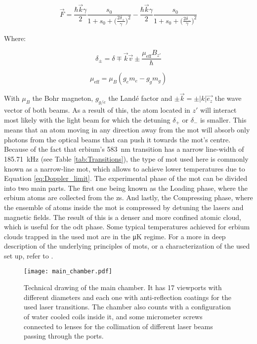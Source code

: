 \begin{equation}\label{eq:MOT_force}
	\vec{F} = \frac{\hbar \vec{k} \gamma}{2} \frac{s_0}{1 + s_0 + \Big(\frac{2\delta_+}{\gamma}\Big)^2} - \frac{\hbar \vec{k} \gamma}{2} \frac{s_0}{1 + s_0 + \Big(\frac{2\delta_-}{\gamma}\Big)^2}
\end{equation}

Where:

\begin{equation}\label{eq:delta_plus_minus}
	\delta_\pm = \delta \mp \vec{k} \vec{v} \pm \frac{ \mu_{ \text{eff} } B_{z'} }{ \hbar }
\end{equation}

\begin{equation}\label{eq:mu_eff}
	\mu_{ \text{eff} } = \mu_B (g_e m_e - g_g m_g)
\end{equation}

With $\mu_B$ the Bohr magneton, $g_{g/e}$ the Landé factor and $\pm \vec{k} = \pm |k| \vec{e_z}$ the wave vector of both beams. As a result of this, the atom located in $z'$ will interact most likely with the light beam for which the detuning $\delta_+$ or $\delta_-$ is smaller. This means that an atom moving in any direction away from the \ac{mot} will absorb only photons from the optical beams that can push it towards the \ac{mot}'s centre. Because of the fact that erbium's \SI{583}{\nano\meter} transition has a narrow line-width of \SI{185.71}{\kilo\hertz} (see Table \ref{tab:Transitions}), the type of \ac{mot} used here is commonly known as a narrow-line \ac{mot}, which allows to achieve lower temperatures due to Equation \eqref{eq:Doppler_limit}. The experimental phase of the \ac{mot} can be divided into two main parts. The first one being known as the Loading phase, where the erbium atoms are collected from the \ac{zs}. And lastly, the Compressing phase, where the ensemble of atoms inside the \ac{mot} is compressed by detuning the lasers and magnetic fields. The result of this is a denser and more confined atomic cloud, which is useful for the \ac{odt} phase. Some typical temperatures achieved for erbium clouds trapped in the used \ac{mot} are in the \si{\micro\kelvin} regime. For a more in deep description of the underlying principles of \Aclp{mot}, or a characterization of the used set up, refer to \cite{Metcalf1999, Ulitzsch2016, Roell2016}. 

\pagebreak

\begin{figure}[!htbp]\centering
	\texttt{[image: main\_chamber.pdf]}
	\caption[Technical drawing of the main chamber]{Technical drawing of the main chamber. It has 17 viewports with different diameters and each one with anti-reflection coatings for the used laser transitions. The chamber also counts with a configuration of water cooled coils inside it, and some micrometer screws connected to lenses for the collimation of different laser beams passing through the ports. }\label{fig:main_chamber}
\end{figure}


